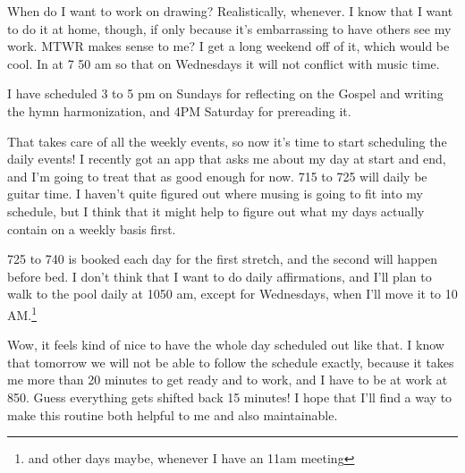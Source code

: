 \documentclass[12pt]{article}[titlepage]
\renewcommand{\,}{\textsuperscript{,}}
\begin{document}
When do I want to work on drawing?  
Realistically, whenever.  
I know that I want to do it at home, though, if only because it's embarrassing to have others see my work.  
MTWR makes sense to me?  
I get a long weekend off of it, which would be cool.  
In at 7 50 am so that on Wednesdays it will not conflict with music time.  


I have scheduled 3 to 5 pm on Sundays for reflecting on the Gospel and writing the hymn harmonization, and 4PM Saturday for prereading it.

That takes care of all the weekly events, so now it's time to start scheduling the daily events!  
I recently got an app that asks me about my day at start and end, and I'm going to treat that as good enough for now.  
715 to 725 will daily be guitar time.  
I haven't quite figured out where musing is going to fit into my schedule, but I think that it might help to figure out what my days actually contain on a weekly basis first.

725 to 740 is booked each day for the first stretch, and the second will happen before bed.  
I don't think that I want to do daily affirmations, and I'll plan to walk to the pool daily at 1050 am, except for Wednesdays, when I'll move it to 10 AM.\footnote{and other days maybe, whenever I have an 11am meeting}

Wow, it feels kind of nice to have the whole day scheduled out like that. I know that tomorrow we will not be able to follow the schedule exactly, because it takes me more than 20 minutes to get ready and to work, and I have to be at work at 850.  
Guess everything gets shifted back 15 minutes!  
I hope that I'll find a way to make this routine both helpful to me and also maintainable.  
\end{document}
